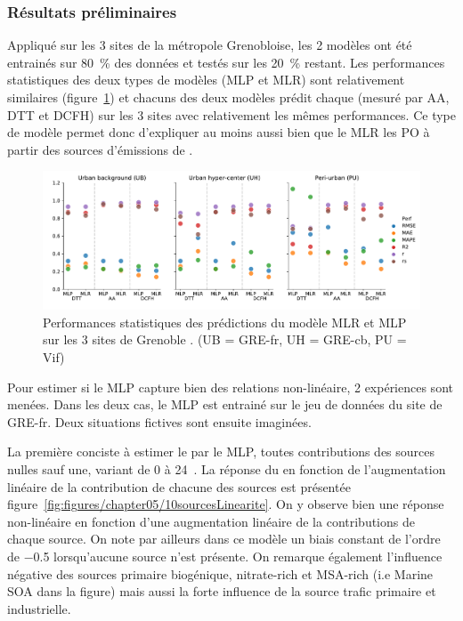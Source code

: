 \subsubsection{Résultats préliminaires}%
\label{ssub:résultats_préliminaires}

Appliqué sur les 3 sites de la métropole Grenobloise, les 2 modèles ont été entrainés sur
\SI{80}{\percent} des données et testés sur les \SI{20}{\percent} restant. Les performances
statistiques des deux types de modèles (MLP et MLR) sont relativement
similaires (figure~\ref{fig:perfMLPMLR}) et chacuns des deux modèles prédit chaque \POv{}
(mesuré par AA, DTT et DCFH) sur les 3 sites avec relativement les mêmes performances.
Ce type de modèle permet donc d'expliquer au moins aussi bien que le MLR les PO à partir
des sources d'émissions de \PMdix.

\begin{figure}[ht]
    \centering
    \includegraphics[width=1.0\linewidth]{figures/chapter05/perfMLPMLR.pdf}
    \caption{Performances statistiques des prédictions du modèle MLR et MLP sur les 3
    sites de Grenoble \autocite{borlazaUrbaninprep.}. (UB = GRE-fr, UH = GRE-cb, PU = Vif)}%
    \label{fig:perfMLPMLR}
\end{figure}

Pour estimer si le MLP capture bien des relations non-linéaire, 2 expériences sont menées.
Dans les deux cas, le MLP est entrainé sur le jeu de données du site de GRE-fr. Deux
situations fictives sont ensuite imaginées.

La première conciste à estimer le \PODTTv{} par le MLP, toutes contributions des sources
nulles sauf une, variant de 0 à 24~\si{\ugm}. La réponse du \PODTTv{} en fonction de
l'augmentation linéaire de la contribution de chacune des sources est présentée
figure~\ref{fig:figures/chapter05/10sourcesLinearite}. On y observe bien une réponse
non-linéaire en fonction d'une augmentation linéaire de la contributions de
chaque source. On note par ailleurs dans ce modèle un biais constant de l'ordre de
\SI{-0.5}{\opv} lorsqu'aucune source n'est présente.
On remarque également l'influence négative des sources primaire biogénique, nitrate-rich
et MSA-rich (i.e Marine SOA dans la figure) mais aussi la forte influence de la source
trafic primaire et industrielle.


